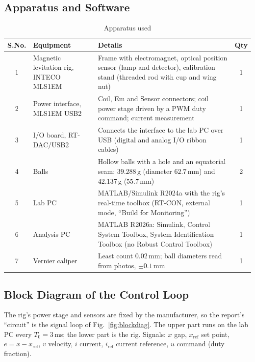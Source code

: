 \documentclass[11pt,a4paper]{article}
\begin{document}
\subsection{Apparatus and Software}
\label{sec:apparatus}
\begin{table}[H]
\centering
\caption{Apparatus used}
\label{tab:apparatus}
\begin{tabularx}{\linewidth}{@{}c>{\raggedright\arraybackslash}p{3.6cm}Xc@{}}
\toprule
S.No. & Equipment & Details & Qty \\
\midrule
1 & Magnetic levitation rig, INTECO MLS1EM & Frame with electromagnet, optical position sensor (lamp and detector), calibration stand (threaded rod with cup and wing nut) & 1 \\
2 & Power interface, MLS1EM USB2 & Coil, Em and Sensor connectors; coil power stage driven by a PWM duty command; current measurement & 1 \\
3 & I/O board, RT-DAC/USB2 & Connects the interface to the lab PC over USB (digital and analog I/O ribbon cables) & 1 \\
4 & Balls & Hollow balls with a hole and an equatorial seam: $39.288$\,g (diameter $62.7$\,mm) and $42.137$\,g ($55.7$\,mm) & 2 \\
5 & Lab PC & MATLAB/Simulink R2024a with the rig's real-time toolbox (RT-CON, external mode, ``Build for Monitoring'') & 1 \\
6 & Analysis PC & MATLAB R2026a: Simulink, Control System Toolbox, System Identification Toolbox (no Robust Control Toolbox) & 1 \\
7 & Vernier caliper & Least count $0.02$\,mm; ball diameters read from photos, $\pm0.1$\,mm & 1 \\
\bottomrule
\end{tabularx}
\end{table}

\subsection{Block Diagram of the Control Loop}
\label{sec:blockdiag}
The rig's power stage and sensors are fixed by the manufacturer, so the report's ``circuit'' is the signal loop of
Fig.~\ref{fig:blockdiag}. The upper part runs on the lab PC every $T_0=3$\,ms; the lower part is the rig. Signals: $x$
gap, $x_{\mathrm{ref}}$ set point, $e=x-x_{\mathrm{ref}}$, $v$ velocity, $i$ current, $i_{\mathrm{ref}}$ current reference,
$u$ command (duty fraction).
\end{document}
